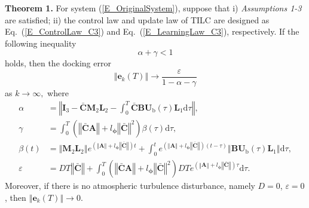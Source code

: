 \textbf{Theorem 1. }For system (\ref{E_OriginalSystem}), suppose that i)
\textit{Assumptions 1-3} are satisfied; ii) the control law and update law of
TILC are designed as Eq.~(\ref{E_ControlLaw_C3}) and
Eq.~(\ref{E_LearningLaw_C3}), respectively. If the following inequality
\begin{equation}
\alpha+\gamma<1 \label{Eq_Condition3}%
\end{equation}
holds, then the docking error%
\begin{equation}
\left \Vert \mathbf{e}_{k}\left(  T\right)  \right \Vert \rightarrow
\frac{\varepsilon}{1-\alpha-\gamma} \label{E_e_docking}%
\end{equation}
as $k\rightarrow \infty,$ where
\begin{align*}
\alpha &  =\left \Vert \mathbf{I}_{3}-\mathbf{\bar{C}M}_{2}\mathbf{L}_{2}-%
{\displaystyle \int \nolimits_{0}^{T}}
\mathbf{\bar{C}BU}_{\text{b}}\left(  \tau \right)  \mathbf{L}_{1}\text{d}%
\tau \right \Vert ,\\
\gamma &  =%
{\displaystyle \int \nolimits_{0}^{T}}
\left(  \left \Vert \mathbf{\bar{C}A}\right \Vert +l_{\boldsymbol{\phi}%
}\left \Vert \mathbf{\bar{C}}\right \Vert ^{2}\right)  \beta \left(  \tau \right)
\text{d}\tau,\\
\beta \left(  t\right)   &  =\left \Vert \mathbf{M}_{2}\mathbf{L}_{2}\right \Vert
e^{\left(  \left \Vert \mathbf{A}\right \Vert +l_{\boldsymbol{\phi}}\left \Vert
	\mathbf{\bar{C}}\right \Vert \right)  t}+%
{\displaystyle \int \nolimits_{0}^{t}}
e^{\left(  \left \Vert \mathbf{A}\right \Vert +l_{\boldsymbol{\phi}}\left \Vert
	\mathbf{\bar{C}}\right \Vert \right)  \left(  t-\tau \right)  }\left \Vert
\mathbf{BU}_{\text{b}}\left(  \tau \right)  \mathbf{L}_{1}\right \Vert
\text{d}\tau,\\
\varepsilon &  =DT\left \Vert \mathbf{\bar{C}}\right \Vert +%
{\displaystyle \int \nolimits_{0}^{T}}
\left(  \left \Vert \mathbf{\bar{C}A}\right \Vert +l_{\boldsymbol{\phi}%
}\left \Vert \mathbf{\bar{C}}\right \Vert ^{2}\right)  DTe^{\left(  \left \Vert
	\mathbf{A}\right \Vert +l_{\boldsymbol{\phi}}\left \Vert \mathbf{\bar{C}%
	}\right \Vert \right)  \tau}\text{d}\tau.
\end{align*}
Moreover, if there is no atmospheric turbulence disturbance, namely $D=0$,
$\varepsilon=0$, then $\left \Vert \mathbf{e}_{k}\left(  T\right)  \right \Vert
\rightarrow0$.

